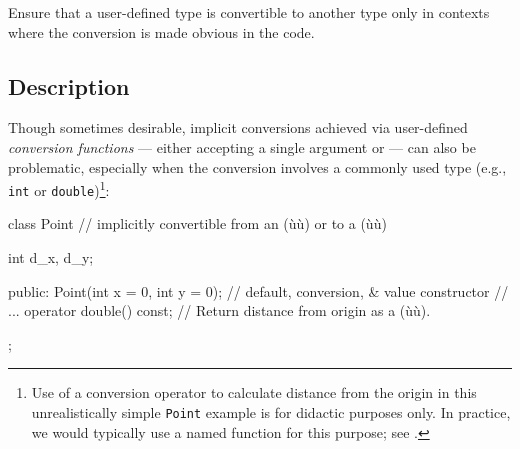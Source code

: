 



\setcounter{table}{0}
\setcounter{footnote}{0}
\setcounter{lstlisting}{0}


Ensure that a user-defined type is convertible to another type only in
contexts where the conversion is made obvious in the code.

\subsection[Description]{Description}\label{description-explicitconv}

Though sometimes desirable, implicit conversions achieved via user-defined \emph{conversion
functions} --- either  accepting a
single argument or  --- can also be problematic, especially when the
conversion involves a commonly used type (e.g., \lstinline!int! or
\lstinline!double!){\cprotect\footnote{Use of a conversion operator to
calculate distance from the origin in this unrealistically simple \lstinline!Point!
example is for didactic purposes only. In practice, we would typically
use a named function for this purpose; see .}}:

\begin{emcppslisting}[language=C++]
class Point  // implicitly convertible from an (ù{}ù) or to a (ù{}ù)
{
    int d_x, d_y;

public:
    Point(int x = 0, int y = 0);  // default, conversion, & value constructor
    // ...
    operator double() const;  // Return distance from origin as a (ù{}ù).
};
\end{emcppslisting}
    

